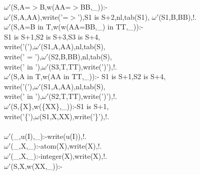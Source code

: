 \documentclass[11pt]{report}
\begin{document}
\begin{sf}
\begin{tabbing}
$\omega'$(S,A=$>$B,w(AA=$>$BB,\_\hspace{0.1em})):-\\[-0.15ex]
\hspace{2em}$\omega'$(S,A,AA),write('=$>$'),S1 is S+2,nl,tab(S1), $\omega'$(S1,B,BB),!.\\[-0.15ex]
$\omega'$(S,A=B in T,w(w(AA=BB,\_\hspace{0.1em}) in TT,\_\hspace{0.1em})):- \\[-0.15ex]
\hspace{2em}S1 is S+1,S2 is S+3,S3 is S+4,\\[-0.15ex]
\hspace{2em}write('('),$\omega'$(S1,A,AA),nl,tab(S),\\[-0.15ex]
\hspace{2em}write(' = '),$\omega'$(S2,B,BB),nl,tab(S),\\[-0.15ex]
\hspace{2em}write(' in '),$\omega'$(S3,T,TT),write(')'),!.\\[-0.15ex]
$\omega'$(S,A in T,w(AA in TT,\_\hspace{0.1em})):- S1 is S+1,S2 is S+4,\\[-0.15ex]
\hspace{2em}write('('),$\omega'$(S1,A,AA),nl,tab(S),\\[-0.15ex]
\hspace{2em}write(' in '),$\omega'$(S2,T,TT),write(')'),!.\\[-0.15ex]
$\omega'$(S,\{X\},w(\{XX\},\_\hspace{0.1em})):-S1 is S+1,\\[-0.15ex]
\hspace{2em}write('\{'),$\omega$(S1,X,XX),write('\}'),!.\\[-0.7ex]
\\[-0.15ex]
$\omega'$(\_\hspace{0.1em},u(I),\_\hspace{0.1em}):-write(u(I)),!.\\[-0.15ex]
$\omega'$(\_\hspace{0.1em},X,\_\hspace{0.1em}):-atom(X),write(X),!.\\[-0.15ex]
$\omega'$(\_\hspace{0.1em},X,\_\hspace{0.1em}):-integer(X),write(X),!.\\[-0.15ex]
$\omega'$(S,X,w(XX,\_\hspace{0.1em})):- \\[-0.15ex]

\end{tabbing}
\end{sf}
\end{document}
